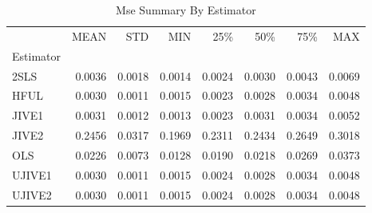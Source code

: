 \begin{table}[ht]
\centering
\caption{Mse Summary By Estimator}
\begin{tabular}{lrrrrrrr}
\toprule
 & MEAN & STD & MIN & 25\% & 50\% & 75\% & MAX \\
Estimator &  &  &  &  &  &  &  \\
\midrule
2SLS & 0.0036 & 0.0018 & 0.0014 & 0.0024 & 0.0030 & 0.0043 & 0.0069 \\
HFUL & 0.0030 & 0.0011 & 0.0015 & 0.0023 & 0.0028 & 0.0034 & 0.0048 \\
JIVE1 & 0.0031 & 0.0012 & 0.0013 & 0.0023 & 0.0031 & 0.0034 & 0.0052 \\
JIVE2 & 0.2456 & 0.0317 & 0.1969 & 0.2311 & 0.2434 & 0.2649 & 0.3018 \\
OLS & 0.0226 & 0.0073 & 0.0128 & 0.0190 & 0.0218 & 0.0269 & 0.0373 \\
UJIVE1 & 0.0030 & 0.0011 & 0.0015 & 0.0024 & 0.0028 & 0.0034 & 0.0048 \\
UJIVE2 & 0.0030 & 0.0011 & 0.0015 & 0.0024 & 0.0028 & 0.0034 & 0.0048 \\
\bottomrule
\end{tabular}
\end{table}
